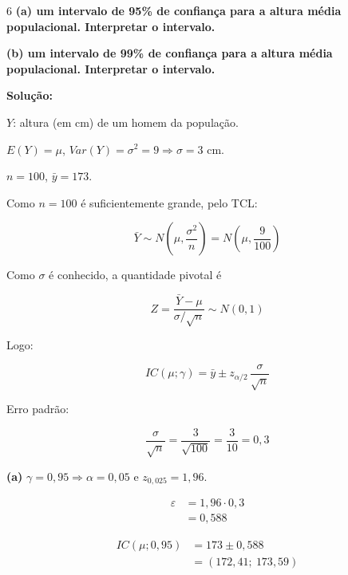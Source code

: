 \documentclass[8pt, a4paper, landscape]{extarticle}
\begin{document}
\begin{multicols}{6}
\textbf{(a) um intervalo de 95\% de confiança para a altura média populacional. Interpretar o intervalo.}

\textbf{(b) um intervalo de 99\% de confiança para a altura média populacional. Interpretar o intervalo.}

\vspace{0.3cm}

\textbf{Solução:}

$Y$: altura (em cm) de um homem da população.

$E(Y) = \mu$, \quad $Var(Y) = \sigma^2 = 9 \Rightarrow \sigma = 3$ cm.

$n = 100$, \quad $\bar{y} = 173$.

Como $n = 100$ é suficientemente grande, pelo TCL:

\begin{equation*}
\bar{Y} \sim N\left(\mu, \frac{\sigma^2}{n}\right) = N\left(\mu, \frac{9}{100}\right)
\end{equation*}

Como $\sigma$ é conhecido, a quantidade pivotal é

\begin{equation*}
Z = \frac{\bar{Y} - \mu}{\sigma/\sqrt{n}} \sim N(0,1)
\end{equation*}

Logo:

\begin{equation*}
IC(\mu;\gamma) = \bar{y} \pm z_{\alpha/2}\,\frac{\sigma}{\sqrt{n}}
\end{equation*}

Erro padrão:

\begin{equation*}
\frac{\sigma}{\sqrt{n}} = \frac{3}{\sqrt{100}} = \frac{3}{10} = 0,3
\end{equation*}

\vspace{0.2cm}

\textbf{(a)} $\gamma = 0,95 \Rightarrow \alpha = 0,05$ e $z_{0,025} = 1,96$.

\begin{equation*}
\begin{split}
\varepsilon &= 1,96 \cdot 0,3 \\
&= 0,588
\end{split}
\end{equation*}

\begin{equation*}
\begin{split}
IC(\mu;0,95) &= 173 \pm 0,588 \\
&= (172,41;\ 173,59)
\end{split}
\end{equation*}


\end{multicols}
\end{document}
